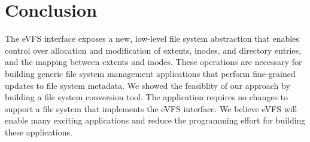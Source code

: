 \documentclass[letterpaper,twocolumn,10pt]{article}
\begin{document}

\vspace{-0.75em}
\section{Conclusion\label{sec:Conclusion}}
\vspace{-0.25em}

The eVFS interface exposes a new, low-level file system abstraction that enables control over allocation and modification of extents, inodes, and directory entries, and the mapping between extents and inodes. These operations are necessary for building generic file system management applications that perform fine-grained updates to file system metadata. We showed the feasiblity of our approach by building a file system conversion tool. The application requires no changes to support a file system that implements the eVFS interface. We believe eVFS will enable many exciting applications and reduce the programming effort for building these applications.

{\footnotesize 
}
\end{document}
